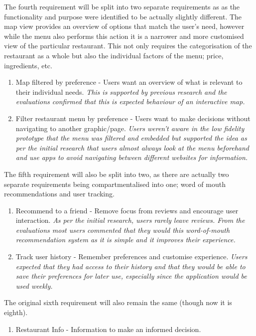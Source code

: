 \documentclass[a4 paper, 12pt]{article}
\begin{document}
    The fourth requirement will be split into two separate requirements as as the functionality and purpose were identified to be actually slightly different. The map view provides an overview of options that match the user's need, however while the menu also performs this action it is a narrower and more customised view of the particular restaurant. This not only requires the categorisation of the restaurant as a whole but also the individual factors of the menu; price, ingredients, etc.    
        \begin{enumerate}[resume]
            \item Map filtered by preference - Users want an overview of what is relevant to their individual needs. 
                \textit{This is supported by previous research and the evaluations confirmed that this is expected behaviour of an interactive map.}
            \item Filter restaurant menu by preference - Users want to make decisions without navigating to another graphic/page. 
                \textit{Users weren't aware in the low fidelity prototype that the menu was filtered and embedded but supported the idea as per the initial research that users almost always look at the menu beforehand and use apps to avoid navigating between different websites for information.}
        \end{enumerate}
    The fifth requirement will also be split into two, as there are actually two separate requirements being compartmentalised into one; word of mouth recommendations and user tracking. 
        \begin{enumerate}[resume]
            \item Recommend to a friend - Remove focus from reviews and encourage user interaction. 
                \textit{As per the initial research, users rarely leave reviews. From the evaluations most users commented that they would this word-of-mouth recommendation system as it is simple and it improves their experience.}
            \item Track user history - Remember preferences and customise experience. 
                \textit{Users expected that they had access to their history and that they would be able to save their preferences for later use, especially since the application would be used weekly.}
        \end{enumerate}
    The original sixth requirement will also remain the same (though now it is eighth).
    \begin{enumerate}[resume]
        \item Restaurant Info - Information to make an informed decision.
    \end{enumerate}
 
\end{document}
